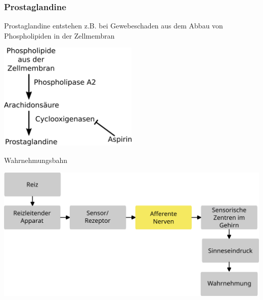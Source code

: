 \documentclass{beamer}
\begin{document}
\begin{frame}
\frametitle{Prostaglandine}

Prostaglandine entstehen z.B. bei Gewebeschaden aus dem Abbau von Phospholipiden in der Zellmembran

\pause

\begin{center}
\includegraphics[width=0.5\textwidth]{prostaglandin_synthese.png}
\end{center}



\end{frame}




\begin{frame}{Wahrnehmungsbahn}
    
    \begin{center}
        \includegraphics[width=\textwidth]{wahrnehmungsprozess_ohne_beispiel_bahnen.png}
    
    \end{center}
    
\end{frame}



\end{document}
